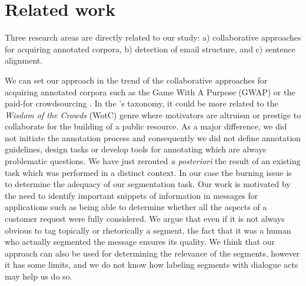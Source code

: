 \section{Related work}
\label{sec:relatedWork}

Three research areas are directly related to our study:
a) collaborative approaches for acquiring
annotated corpora, b) detection of email structure, and c) sentence alignment.


We can set our approach in the trend of the collaborative approaches for acquiring
annotated corpora such as the Game With A Purpose (GWAP) \cite{ahn:2006:computer} or the paid-for crowdsourcing \cite{fort:2011:cl}.
In the \cite{wang:2013:lre}'s taxonomy, it could be more related to the \textit{Wisdom of the Crowds} (WotC) genre where motivators are altruism or prestige to collaborate for the building of a public resource.
As a major difference, we did not initiate the annotation process and consequently we did not define annotation guidelines, design tasks or develop tools for annotating which are always problematic questions.
We have just rerouted \textit{a posteriori} the result of an existing task which was performed in a distinct context.
In our case the burning issue is to determine the adequacy of our segmentation task.
Our work is motivated by the need to identify important snippets of information in messages for applications such as being able to determine whether all the aspects of a customer request were fully considered.
We argue that even if it is not always obvious to tag topically or rhetorically a segment, the fact that it was a human who actually segmented the message ensures its quality.
%
%
We think that our approach can also be used for determining the relevance of the segments, however it has some limits, and we do not know how labeling segments with dialogue acts may help us do so.

